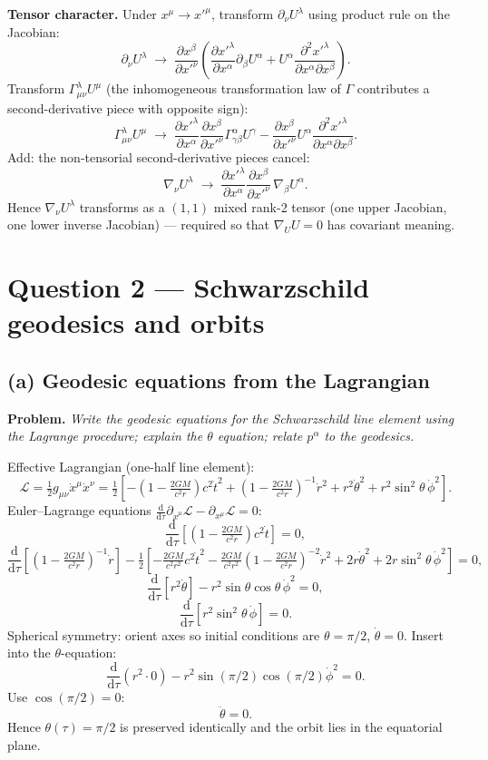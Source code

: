 \documentclass[11pt]{article}
\newcommand{\de}{\mathrm{d}}
\newcommand{\pd}[2]{\frac{\partial #1}{\partial #2}}
\begin{document}
\textbf{Tensor character.} Under $x^\mu\to x'^\mu$, transform $\partial_\nu U^\lambda$ using product rule on the Jacobian:
\[
\partial_\nu U^\lambda \;\to\; \pd{x^\beta}{x'^\nu}\!\left(\pd{x'^\lambda}{x^\alpha}\partial_\beta U^\alpha + U^\alpha\frac{\partial^2 x'^\lambda}{\partial x^\alpha\partial x^\beta}\right).
\]
Transform $\Gamma^\lambda_{\mu\nu}U^\mu$ (the inhomogeneous transformation law of $\Gamma$ contributes a second-derivative piece with opposite sign):
\[
\Gamma^\lambda_{\mu\nu}U^\mu \;\to\; \pd{x'^\lambda}{x^\alpha}\pd{x^\beta}{x'^\nu}\Gamma^\alpha_{\gamma\beta}U^\gamma - \pd{x^\beta}{x'^\nu}U^\alpha\frac{\partial^2 x'^\lambda}{\partial x^\alpha\partial x^\beta}.
\]
Add: the non-tensorial second-derivative pieces cancel:
\[
\nabla_\nu U^\lambda \;\to\; \pd{x'^\lambda}{x^\alpha}\pd{x^\beta}{x'^\nu}\,\nabla_\beta U^\alpha.
\]
Hence $\nabla_\nu U^\lambda$ transforms as a $(1,1)$ mixed rank-2 tensor (one upper Jacobian, one lower inverse Jacobian) --- required so that $\nabla_U U = 0$ has covariant meaning.

\section*{Question 2 --- Schwarzschild geodesics and orbits}

\subsection*{(a) Geodesic equations from the Lagrangian}

\textbf{Problem.} \emph{Write the geodesic equations for the Schwarzschild line element using the Lagrange procedure; explain the $\theta$ equation; relate $p^\alpha$ to the geodesics.}

Effective Lagrangian (one-half line element):
\[
\mathcal L = \tfrac{1}{2}g_{\mu\nu}\dot x^\mu\dot x^\nu = \tfrac{1}{2}\!\left[-\!\left(1-\tfrac{2GM}{c^2 r}\right)c^2\dot t^2 + \!\left(1-\tfrac{2GM}{c^2 r}\right)^{-1}\!\!\dot r^2 + r^2\dot\theta^2 + r^2\sin^2\theta\,\dot\phi^2\right].
\]
Euler--Lagrange equations $\frac{\de}{\de\tau}\partial_{\dot x^\mu}\mathcal L - \partial_{x^\mu}\mathcal L = 0$:
\[
\frac{\de}{\de\tau}\!\left[\!\left(1-\tfrac{2GM}{c^2 r}\right)c^2\dot t\right] = 0,
\]
\[
\frac{\de}{\de\tau}\!\left[\!\left(1-\tfrac{2GM}{c^2 r}\right)^{-1}\!\dot r\right] - \tfrac{1}{2}\!\left[-\tfrac{2GM}{c^2 r^2}c^2\dot t^2 - \tfrac{2GM}{c^2 r^2}\!\left(1-\tfrac{2GM}{c^2 r}\right)^{-2}\!\dot r^2 + 2r\dot\theta^2 + 2r\sin^2\theta\,\dot\phi^2\right] = 0,
\]
\[
\frac{\de}{\de\tau}\!\left[r^2\dot\theta\right] - r^2\sin\theta\cos\theta\,\dot\phi^2 = 0,
\]
\[
\frac{\de}{\de\tau}\!\left[r^2\sin^2\theta\,\dot\phi\right] = 0.
\]
Spherical symmetry: orient axes so initial conditions are $\theta = \pi/2$, $\dot\theta = 0$. Insert into the $\theta$-equation:
\[
\frac{\de}{\de\tau}(r^2\cdot 0) - r^2\sin(\pi/2)\cos(\pi/2)\dot\phi^2 = 0.
\]
Use $\cos(\pi/2)=0$:
\[
\ddot\theta = 0.
\]
Hence $\theta(\tau) = \pi/2$ is preserved identically and the orbit lies in the equatorial plane.
\end{document}
